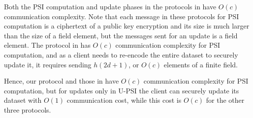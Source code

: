 
Both the PSI computation and update phases in the protocols in \cite{opsi15,yang2018improved,DBLP:conf/fc/AbadiTD16} have  $O(c)$ communication complexity.  Note that each message in these protocols for PSI computation is a ciphertext of a public key encryption and its size is  much larger  than the size of a field element, but the messages sent for an update is a field element. The protocol in \cite{eopsi} has $O(c)$ communication complexity for PSI computation, and as a client needs to re-encode the entire dataset to securely update it, it requires sending $h(2d+1)$, or $O(c)$ elements of a finite field.  


Hence,  our protocol and those in \cite{opsi15,DBLP:conf/fc/AbadiTD16,yang2018improved} have $O(c)$ communication complexity for PSI computation, but for updates only in U-PSI the client can securely update its dataset with $O(1)$ communication cost, while this cost is $O(c)$  for the other three protocols.